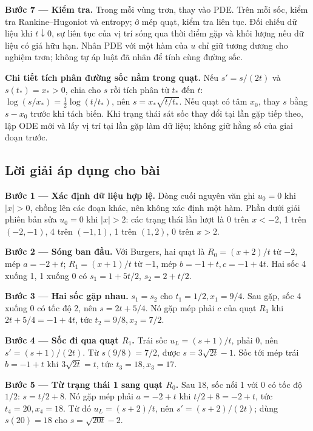 \documentclass[10pt,a4paper]{article}
\begin{document}
\textbf{Bước 7 — Kiểm tra.} Trong mỗi vùng trơn, thay vào PDE. Trên mỗi sốc, kiểm tra Rankine–Hugoniot và entropy; ở mép quạt, kiểm tra liên tục. Đối chiếu dữ liệu khi $t\downarrow0$, sự liên tục của vị trí sóng qua thời điểm gặp và khối lượng nếu dữ liệu có giá hữu hạn. Nhân PDE với một hàm của $u$ chỉ giữ tương đương cho nghiệm trơn; không tự áp luật đã nhân để tính cùng đường sốc.

\textbf{Chi tiết tích phân đường sốc nằm trong quạt.} Nếu $s'=s/(2t)$ và $s(t_*)=x_*>0$, chia cho $s$ rồi tích phân từ $t_*$ đến $t$: $\log(s/x_*)=\frac12\log(t/t_*)$, nên $s=x_*\sqrt{t/t_*}$. Nếu quạt có tâm $x_0$, thay $s$ bằng $s-x_0$ trước khi tách biến. Khi trạng thái sát sốc thay đổi tại lần gặp tiếp theo, lập ODE mới và lấy vị trí tại lần gặp làm dữ liệu; không giữ hằng số của giai đoạn trước.
\subsection*{Lời giải áp dụng cho bài}
\textbf{Bước 1 — Xác định dữ liệu hợp lệ.} Dòng cuối nguyên văn ghi $u_0=0$ khi $|x|>0$, chồng lên các đoạn khác, nên không xác định một hàm. Phần dưới giải phiên bản sửa $u_0=0$ khi $|x|>2$: các trạng thái lần lượt là 0 trên $x<-2$, 1 trên $(-2,-1)$, 4 trên $(-1,1)$, 1 trên $(1,2)$, 0 trên $x>2$.

\textbf{Bước 2 — Sóng ban đầu.} Với Burgers, hai quạt là $R_0=(x+2)/t$ từ $-2$, mép $a=-2+t$; $R_1=(x+1)/t$ từ $-1$, mép $b=-1+t,c=-1+4t$. Hai sốc 4 xuống 1, 1 xuống 0 có $s_1=1+5t/2$, $s_2=2+t/2$.

\textbf{Bước 3 — Hai sốc gặp nhau.} $s_1=s_2$ cho $t_1=1/2,x_1=9/4$. Sau gặp, sốc 4 xuống 0 có tốc độ 2, nên $s=2t+5/4$. Nó gặp mép phải $c$ của quạt $R_1$ khi $2t+5/4=-1+4t$, tức $t_2=9/8,x_2=7/2$.

\textbf{Bước 4 — Sốc đi qua quạt $R_1$.} Trái sốc $u_L=(s+1)/t$, phải 0, nên $s'=(s+1)/(2t)$. Từ $s(9/8)=7/2$, được $s=3\sqrt{2t}-1$. Sốc tới mép trái $b=-1+t$ khi $3\sqrt{2t}=t$, tức $t_3=18,x_3=17$.

\textbf{Bước 5 — Từ trạng thái 1 sang quạt $R_0$.} Sau $18$, sốc nối 1 với 0 có tốc độ $1/2$: $s=t/2+8$. Nó gặp mép phải $a=-2+t$ khi $t/2+8=-2+t$, tức $t_4=20,x_4=18$. Từ đó $u_L=(s+2)/t$, nên $s'=(s+2)/(2t)$; dùng $s(20)=18$ cho $s=\sqrt{20t}-2$.
\end{document}
